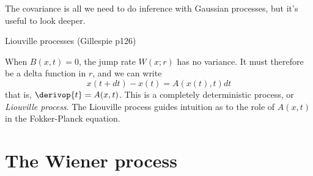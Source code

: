 \documentclass{beamer}
\begin{document}
\begin{frame}{}
  The covariance is all we need to do inference with Gaussian processes, but it's useful to look deeper.

  Liouville processes (Gillespie p126)
 
  When $B(x,t)=0$, the jump rate $W(x;r)$ has no variance.
It must therefore be a delta function in $r$, and we can write
\[
x(t+dt) - x(t) = A(x(t),t) dt
\]
that is, $\derivop{t} = A(x,t)$.
  This is a completely deterministic process, or {\em Liouville process}.
  The Liouville process guides intuition as to the role of $A(x,t)$ in the Fokker-Planck equation.
 


\end{frame}

\section{The Wiener process}
\end{document}
